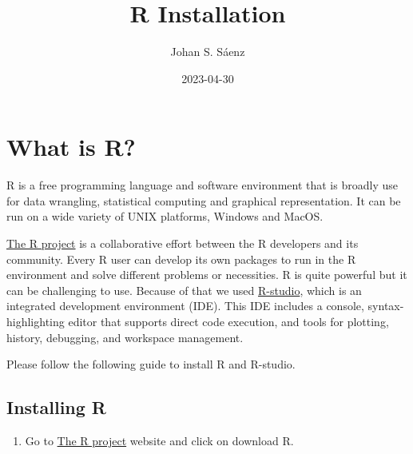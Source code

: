 \documentclass[
  letterpaper,
  DIV=11,
  numbers=noendperiod]{scrartcl}
\title{R Installation}
\author{Johan S. Sáenz}
\date{2023-04-30}
\providecommand{\tightlist}{%
  \setlength{\itemsep}{0pt}\setlength{\parskip}{0pt}}\usepackage{longtable,booktabs,array}
\renewcommand*\contentsname{Table of contents}
\newcommand\contentsname{Table of contents}
\begin{document}
\maketitle
\ifdefined\Shaded\renewenvironment{Shaded}{\begin{tcolorbox}[interior hidden, boxrule=0pt, enhanced, breakable, borderline west={3pt}{0pt}{shadecolor}, sharp corners, frame hidden]}{\end{tcolorbox}}\fi

\renewcommand*\contentsname{Table of contents}
{
\hypersetup{linkcolor=}
\setcounter{tocdepth}{3}
\tableofcontents
}
\hypertarget{what-is-r}{%
\section{\texorpdfstring{\textbf{What is
R?}}{What is R?}}\label{what-is-r}}

R is a free programming language and software environment that is
broadly use for data wrangling, statistical computing and graphical
representation. It can be run on a wide variety of UNIX platforms,
Windows and MacOS.

\href{https://www.r-project.org}{The R project} is a collaborative
effort between the R developers and its community. Every R user can
develop its own packages to run in the R environment and solve different
problems or necessities. R is quite powerful but it can be challenging
to use. Because of that we used
\href{https://posit.co/download/rstudio-desktop/}{R-studio}, which is an
integrated development environment (IDE). This IDE includes a console,
syntax-highlighting editor that supports direct code execution, and
tools for plotting, history, debugging, and workspace management.

Please follow the following guide to install R and R-studio.

\hypertarget{installing-r}{%
\subsection{Installing R}\label{installing-r}}

\begin{enumerate}
\def\labelenumi{\arabic{enumi}.}
\tightlist
\item
  Go to \href{https://www.r-project.org}{The R project} website and
  click on download R.
\end{enumerate}
\end{document}
